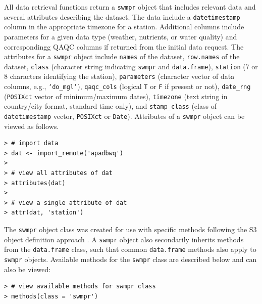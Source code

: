\documentclass[10pt,letterpaper]{article}\usepackage[]{graphicx}\usepackage[]{color}
\makeatletter
\newenvironment{kframe}{%
 \def\at@end@of@kframe{}%
 \ifinner\ifhmode%
  \def\at@end@of@kframe{\end{minipage}}%
  \begin{minipage}{\columnwidth}%
 \fi\fi%
 \def\FrameCommand##1{\hskip\@totalleftmargin \hskip-\fboxsep
 \colorbox{shadecolor}{##1}\hskip-\fboxsep
     \hskip-\linewidth \hskip-\@totalleftmargin \hskip\columnwidth}%
 \MakeFramed {\advance\hsize-\width
   \@totalleftmargin\z@ \linewidth\hsize
   \@setminipage}}%
 {\par\unskip\endMakeFramed%
 \at@end@of@kframe}
\newenvironment{knitrout}{}{} %
\makeatother
\begin{document}
All data retrieval functions return a \texttt{swmpr} object that includes relevant data and several attributes describing the dataset.  The data include a \texttt{datetimestamp} column in the appropriate timezone for a station.  Additional columns include parameters for a given data type (weather, nutrients, or water quality) and correspondingg \ac{QAQC} columns if returned from the initial data request.  The attributes for a \texttt{swmpr} object include \texttt{names} of the dataset, \texttt{row.names} of the dataset, \texttt{class} (character string indicating \texttt{swmpr} and \texttt{data.frame}), \texttt{station} (7 or 8 characters identifying the station),  \texttt{parameters} (character vector of data columns, e.g., \texttt{`do\_mgl'}), \texttt{qaqc\_cols} (logical \texttt{T} or \texttt{F} if present or not), \texttt{date\_rng} (\texttt{POSIXct} vector of minimum/maximum dates), \texttt{timezone} (text string in country/city format, standard time only), and \texttt{stamp\_class} (class of \texttt{datetimestamp} vector, \texttt{POSIXct} or \texttt{Date}).  Attributes of a \texttt{swmpr} object can be viewed as follows.

\begin{knitrout}
\color{fgcolor}\begin{kframe}
\begin{verbatim}
> # import data
> dat <- import_remote('apadbwq')
>  
> # view all attributes of dat
> attributes(dat)
>  
> # view a single attribute of dat
> attr(dat, 'station')
\end{verbatim}
\end{kframe}
\end{knitrout}
 
The \texttt{swmpr} object class was created for use with specific methods following the S3 object definition approach \cite{Wickham14}.  A \texttt{swmpr} object also secondarily inherits methods from the \texttt{data.frame} class, such that common \texttt{data.frame} methods also apply to \texttt{swmpr} objects.  Available methods for the \texttt{swmpr} class are described below and can also be viewed:
 
\begin{knitrout}
\color{fgcolor}\begin{kframe}
\begin{verbatim}
> # view available methods for swmpr class
> methods(class = 'swmpr')
\end{verbatim}
\end{kframe}
\end{knitrout}
\end{document}

